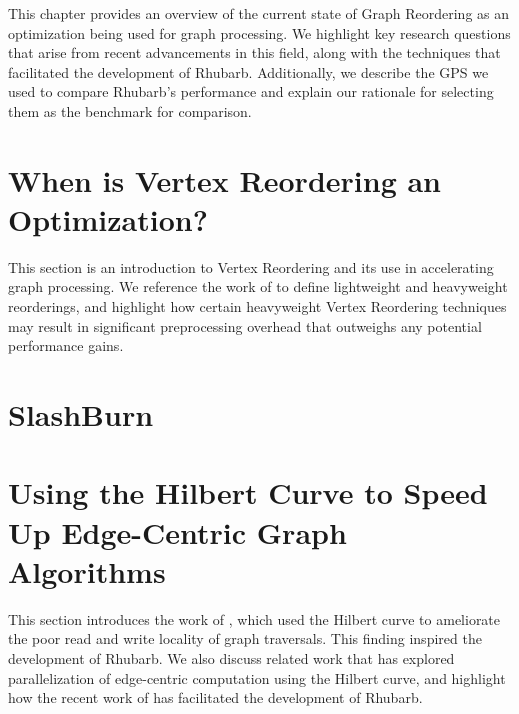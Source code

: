 

This chapter provides an overview of the current state of Graph Reordering as an optimization being used for graph processing. We highlight key research questions that arise from recent advancements in this field, along with the techniques that facilitated the development of Rhubarb. Additionally, we describe the GPS we used to compare Rhubarb's performance and explain our rationale for selecting them as the benchmark for comparison.

\section{When is Vertex Reordering an Optimization?}
This section is an introduction to Vertex Reordering and its use in accelerating graph processing. We reference the work of \citet{lwr} to define lightweight and heavyweight reorderings, and highlight how certain heavyweight Vertex Reordering techniques may result in significant preprocessing overhead that outweighs any potential performance gains.





\section{SlashBurn}


\section{Using the Hilbert Curve to Speed Up Edge-Centric Graph Algorithms}
This section introduces the work of \citet{cost}, which used the Hilbert curve to ameliorate the poor read and write locality of graph traversals. This finding inspired the development of Rhubarb. We also discuss related work that has explored parallelization of edge-centric computation using the Hilbert curve, and highlight how the recent work of \citet{spray} has facilitated the development of Rhubarb.

